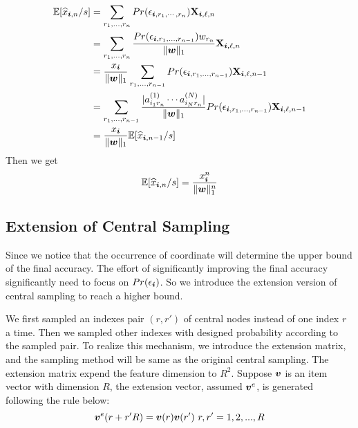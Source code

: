 \documentclass[letterpaper]{article}
\newcommand{\Sca}[3]{{#1}^{(#2)}_{i_#2#3}}%
\newcommand{\V}[1]{{\bm{{\MakeLowercase{#1}}}}}
\newcommand{\M}[1]{{\bm{\mathbf{\MakeUppercase{#1}}}}}
\newcommand{\norm}[2]{\|#1\|_{#2}}
\begin{document}
\begin{align*}
\mathbb{E}[\widehat{x}_{\V{i},n}/s] 
& = \sum_{r_1,\ldots,r_n}Pr(\epsilon_{\V{i},r_1,\cdots,r_n})\M{X}_{\V{i},\ell,n}\\
& = \sum_{r_1,\ldots,r_n}
\frac{Pr(\epsilon_{\V{i},r_1,\ldots,r_{n-1}})w_{r_n}}{\norm{\V{w}}{1}}\M{X}_{\V{i},\ell,n}\\
& = \frac{x_{\V{i}}}{\norm{\V{w}}{1}}\sum_{r_1,\ldots,r_{n-1}}
Pr(\epsilon_{\V{i},r_1,\ldots,r_{n-1}})\M{X}_{\V{i},\ell,n-1}\\
& = \sum_{r_1,\ldots,r_{n-1}}
\frac{|\Sca{a}{1}{r_n}\cdots\Sca{a}{N}{r_n}|}{\norm{\V{w}}{1}}
Pr(\epsilon_{\V{i},r_1,\ldots,r_{n-1}})\M{X}_{\V{i},\ell,n-1}\\
& = \frac{x_{\V{i}}}{\norm{\V{w}}{1}}\mathbb{E}[\widehat{x}_{\V{i},n-1}/s]
\end{align*}
Then we get 
\begin{equation}
\mathbb{E}[\widehat{x}_{\V{i},n}/s] = \frac{x^n_{\V{i}}}{\norm{\V{w}}{1}^n}
\end{equation}

\subsection{Extension of Central Sampling}

Since we notice that the occurrence of coordinate will determine the upper bound of the final accuracy. The effort of significantly improving the final accuracy significantly need to focus on $Pr(\epsilon_{\V{i}})$. So we introduce the extension version of central sampling to reach a higher bound. 

We first sampled an indexes pair $(r,r')$ of central nodes instead of one index $r$ a time. Then we sampled other indexes with designed probability according to the sampled pair. To realize this mechanism, we introduce the extension matrix, and the sampling method will be same as the original central sampling. The extension matrix expend the feature dimension to $R^2$. Suppose $\V{v}$ is an item vector with dimension $R$, the extension vector, assumed $\V{v}^e$, is generated following the rule below:
\[
\V{v}^e(r+r'R) = \V{v}(r)\V{v}(r')\ r,r' = {1,2,...,R}
\]
\end{document}
